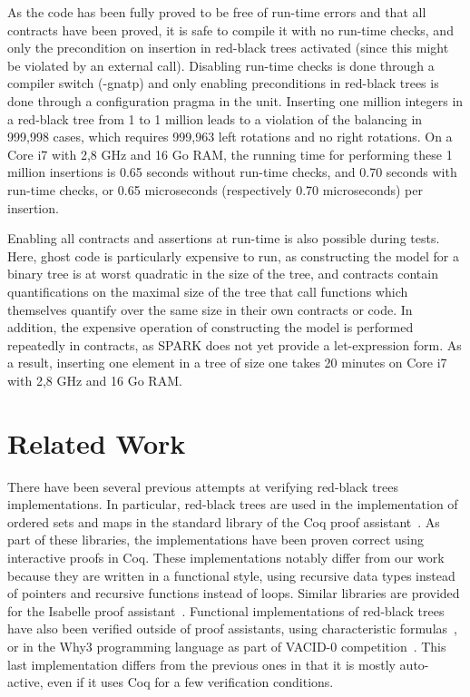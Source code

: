 \documentclass{llncs}
\begin{document}
As the code has been fully proved to be free of run-time errors and that all
contracts have been proved, it is safe to compile it with no run-time checks,
and only the precondition on insertion in red-black trees activated (since this
might be violated by an external call). Disabling run-time checks is done
through a compiler switch (-gnatp) and only enabling preconditions in red-black
trees is done through a configuration pragma in the unit. Inserting one million
integers in a red-black tree from 1 to 1 million leads to a violation of the
balancing in 999,998 cases, which requires 999,963 left rotations and no
right rotations. On a Core i7 with 2,8 GHz and 16 Go RAM, the running time for
performing these 1 million insertions is 0.65 seconds without run-time checks,
and 0.70 seconds with run-time checks, or 0.65 microseconds (respectively 0.70
microseconds) per insertion.

Enabling all contracts and assertions at run-time is also possible during
tests. Here, ghost code is particularly expensive to run, as constructing the
model for a binary tree is at worst quadratic in the size of the tree, and
contracts contain quantifications on the maximal size of the tree that call
functions which themselves quantify over the same size in their own contracts
or code. In addition, the expensive operation of constructing the model is
performed repeatedly in contracts, as SPARK does not yet provide a
let-expression form.  As a result, inserting one element in a tree of size one
takes 20 minutes on Core i7 with 2,8 GHz and 16 Go RAM.

\section{Related Work}
\label{related-work}
There have been several previous attempts at verifying red-black trees implementations. In particular, red-black trees are
used in the implementation of ordered sets and maps in the standard library of the Coq proof
assistant~\cite{appel2011efficient,filliatre2004functors}. As part of these libraries, the implementations have been proven
correct using interactive proofs in Coq. These implementations notably differ from our work because they are written in
a functional style, using recursive data types instead of pointers and recursive functions instead of loops. Similar
libraries are provided for the Isabelle proof assistant~\cite{lammich2010isabelle}. Functional implementations of
red-black trees have also been verified outside of proof assistants, using characteristic formulas~\cite{chargueraud2010program},
or in the Why3 programming language as part of VACID-0 competition~\cite{leino2010vacid}. This last implementation differs from
the previous ones in that it is mostly auto-active, even if it uses Coq for a few verification conditions.
\end{document}
